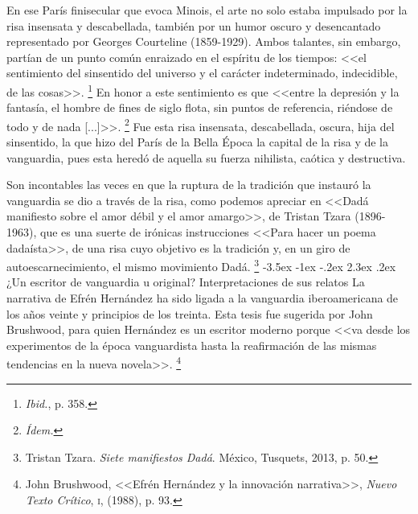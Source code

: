 \documentclass[14pt,twoside,final]{extbook} %
\makeatletter
\let\oldfootnote\footnote
\renewcommand\footnote[1]{%
\oldfootnote{\hspace{1mm}#1}}
\renewcommand\section{\@startsection {section}{1}{\z@}%
                                     {-3.5ex \@plus -1ex \@minus -.2ex}%
                                     {2.3ex \@plus .2ex}%
                                     {\normalfont\large\bfseries\sc}}
\makeatother
\begin{document}
En ese París finisecular que evoca Minois, el arte no solo estaba impulsado por la risa insensata y descabellada, también por un humor oscuro y desencantado representado por Georges Courteline (1859-1929). Ambos talantes, sin embargo, partían de un punto común enraizado en el espíritu de los tiempos: <<el sentimiento del sinsentido del universo y el carácter indeterminado, indecidible, de las cosas>>.\footnote{\emph{Ibid.}, p. 358.} En honor a este sentimiento es que <<entre la depresión y la fantasía, el hombre de fines de siglo flota, sin puntos de referencia, riéndose de todo y de nada [...]>>.\footnote{\emph{Ídem.}} Fue esta risa insensata, descabellada, oscura, hija del sinsentido, la que hizo del París de la Bella Época la capital de la risa y de la vanguardia, pues esta heredó de aquella
su fuerza nihilista, caótica y destructiva.

Son incontables las veces en que la ruptura de la tradición que instauró la vanguardia se dio a través de la risa, como podemos apreciar en <<Dadá manifiesto sobre el amor débil y el amor amargo>>, de Tristan Tzara (\mbox{1896-1963}), que es una suerte de irónicas instrucciones <<Para hacer un poema dadaísta>>, de una risa cuyo objetivo es la tradición y, en un giro de autoescarnecimiento, el mismo movimiento Dadá.\footnote{Tristan Tzara. \emph{Siete manifiestos Dadá}. México, Tusquets, 2013, p. 50.}
\section{¿Un escritor de vanguardia u original? Interpretaciones de sus relatos}\label{sec:un-escritor-de-vanguardia-u-original-interprestaciones-de-sus-relatos}
La narrativa de Efrén Hernández ha sido ligada a la vanguardia iberoamericana de los años veinte y principios de los treinta. Esta tesis fue sugerida por John Brushwood, para quien Hernández es un escritor moderno porque <<va desde los experimentos de la época vanguardista hasta la reafirmación de las mismas tendencias en la nueva novela>>.\footnote{John Brushwood, <<Efrén Hernández y la innovación narrativa>>, \emph{Nuevo Texto Crítico}, \textsc{i}, (1988), p. 93.}
\end{document}
